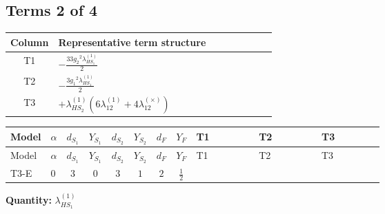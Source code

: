 \documentclass[8pt]{article}
\begin{document}
\begin{landscape}
\subsection*{Terms 2 of 4}
\begin{center}
\begin{tabular}{@{}c >{\raggedright\arraybackslash}p{0.82\linewidth}@{}}
\toprule
Column & Representative term structure \\
\midrule
T1 & \(\displaystyle -\frac{33 {g_2}^2 {\lambda_{HS_1}^{(1)}}}{2}\) \\
\midrule
T2 & \(\displaystyle -\frac{3 {g_1}^2 {\lambda_{HS_1}^{(1)}}}{2}\) \\
\midrule
T3 & \(\displaystyle +{\lambda_{HS_2}^{(1)}} (6 {\lambda_{12}^{(1)}}+4 {\lambda_{12}^{(\times)}})\) \\
\midrule
\bottomrule
\end{tabular}
\end{center}
\smallskip
\tiny
\begin{longtable}{@{}llcccccc >{\raggedright\arraybackslash}p{0.21\linewidth} >{\raggedright\arraybackslash}p{0.21\linewidth} >{\raggedright\arraybackslash}p{0.21\linewidth}@{}}
\toprule
Model & $\alpha$ & $d_{S_1}$ & $Y_{S_1}$ & $d_{S_2}$ & $Y_{S_2}$ & $d_F$ & $Y_F$ & T1 & T2 & T3 \\
\midrule
\endfirsthead
\toprule
Model & $\alpha$ & $d_{S_1}$ & $Y_{S_1}$ & $d_{S_2}$ & $Y_{S_2}$ & $d_F$ & $Y_F$ & T1 & T2 & T3 \\
\midrule
\endhead
T3-E & $0$ & $3$ & $0$ & $3$ & $1$ & $2$ & $\frac{1}{2}$ & \scriptsize\adjustbox{max width=\linewidth}{$\begin{gathered} -\frac{33 {g_2}^2 {\lambda_{HS_1}^{(1)}}}{2}\end{gathered}$} & \scriptsize\adjustbox{max width=\linewidth}{$\begin{gathered} -\frac{3 {g_1}^2 {\lambda_{HS_1}^{(1)}}}{2}\end{gathered}$} & \scriptsize\adjustbox{max width=\linewidth}{$\begin{gathered} +{\lambda_{HS_2}^{(1)}} (6 {\lambda_{12}^{(1)}}+4 {\lambda_{12}^{(\times)}})\end{gathered}$} \\
\midrule
\bottomrule
\end{longtable}
\clearpage
\noindent\textbf{Quantity: }$\lambda_{HS_1}^{(1)}$\par\smallskip

\end{landscape}
\end{document}
